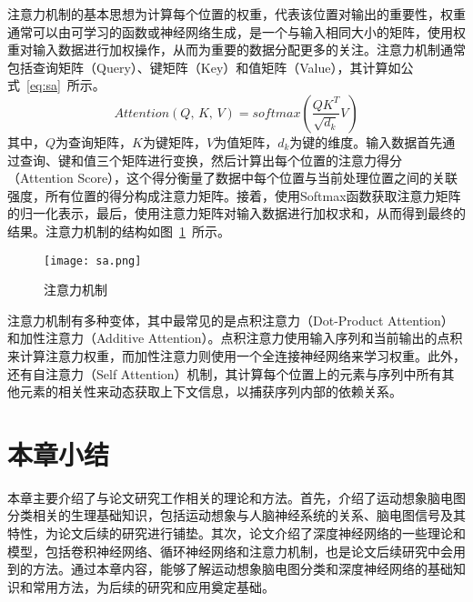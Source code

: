 注意力机制的基本思想为计算每个位置的权重，代表该位置对输出的重要性，权重通常可以由可学习的函数或神经网络生成，是一个与输入相同大小的矩阵，使用权重对输入数据进行加权操作，从而为重要的数据分配更多的关注。注意力机制通常包括查询矩阵（Query）、键矩阵（Key）和值矩阵（Value），其计算如公式~\ref{eq:sa}~所示。
\begin{equation}\label{eq:sa}
    Attention(Q,\,K,\,V)=softmax(\frac{QK^{T}}{\sqrt{d_k}}V)
\end{equation}
其中，\(Q\)为查询矩阵，\(K\)为键矩阵，\(V\)为值矩阵，\(d_k\)为键的维度。输入数据首先通过查询、键和值三个矩阵进行变换，然后计算出每个位置的注意力得分（Attention Score），这个得分衡量了数据中每个位置与当前处理位置之间的关联强度，所有位置的得分构成注意力矩阵。接着，使用Softmax函数获取注意力矩阵的归一化表示，最后，使用注意力矩阵对输入数据进行加权求和，从而得到最终的结果。注意力机制的结构如图~\ref{fig:sa}~所示。
\begin{figure}[ht]
    \centering
    \texttt{[image: sa.png]}
    \caption{注意力机制}
    \label{fig:sa}
\end{figure}

注意力机制有多种变体，其中最常见的是点积注意力（Dot-Product Attention）和加性注意力（Additive Attention）。点积注意力使用输入序列和当前输出的点积来计算注意力权重，而加性注意力则使用一个全连接神经网络来学习权重。此外，还有自注意力（Self Attention）\cite{vaswani2017attention}机制，其计算每个位置上的元素与序列中所有其他元素的相关性来动态获取上下文信息，以捕获序列内部的依赖关系。

\section{本章小结}

本章主要介绍了与论文研究工作相关的理论和方法。首先，介绍了运动想象脑电图分类相关的生理基础知识，包括运动想象与人脑神经系统的关系、脑电图信号及其特性，为论文后续的研究进行铺垫。其次，论文介绍了深度神经网络的一些理论和模型，包括卷积神经网络、循环神经网络和注意力机制，也是论文后续研究中会用到的方法。通过本章内容，能够了解运动想象脑电图分类和深度神经网络的基础知识和常用方法，为后续的研究和应用奠定基础。